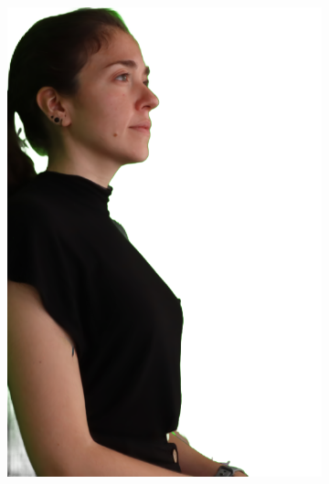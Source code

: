 \begin{figure}[!ht]
\begin{subfigure}{0.12\linewidth}
        \includegraphics[width=\textwidth]{Figures/results/initials/irene/20_render.png}

\end{subfigure}
\end{figure}
